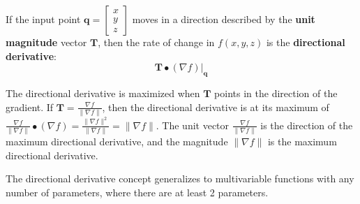 \documentclass{article}
\begin{document}
If the input point \(\mathbf{q} = \begin{bmatrix} x \\ y \\ z \end{bmatrix}\) moves in a direction described by the {\bf unit magnitude} vector \(\mathbf{T}\), then the rate of change in \(f(x, y, z)\) is the {\bf directional derivative}:
\[\mathbf{T} \bullet (\nabla f)\Big|_{\mathbf{q}}\]

The directional derivative is maximized when \(\mathbf{T}\) points in the direction of the gradient. If \(\mathbf{T} = \frac{\nabla f}{\|\nabla f\|}\), then the directional derivative is at its maximum of \(\frac{\nabla f}{\|\nabla f\|} \bullet (\nabla f) = \frac{\|\nabla f\|^2}{\|\nabla f\|} = \|\nabla f\|\). The unit vector \(\frac{\nabla f}{\|\nabla f\|}\) is the direction of the maximum directional derivative, and the magnitude \(\|\nabla f\|\) is the maximum directional derivative. 

\vspace{5mm}

The directional derivative concept generalizes to multivariable functions with any number of parameters, where there are at least 2 parameters. 


\vspace{5mm}
\end{document}
